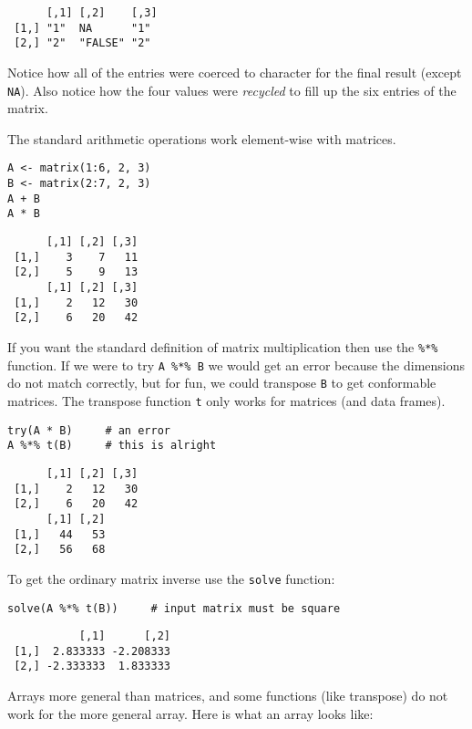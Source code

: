 \documentclass[captions=tableheading]{scrbook}
\begin{document}
\begin{verbatim}
      [,1] [,2]    [,3]
 [1,] "1"  NA      "1" 
 [2,] "2"  "FALSE" "2"
\end{verbatim}

Notice how all of the entries were coerced to character for the final result (except \texttt{NA}). Also notice how the four values were \emph{recycled} to fill up the six entries of the matrix.

The standard arithmetic operations work element-wise with matrices.


\begin{verbatim}
A <- matrix(1:6, 2, 3)
B <- matrix(2:7, 2, 3)
A + B
A * B
\end{verbatim}

\begin{verbatim}
      [,1] [,2] [,3]
 [1,]    3    7   11
 [2,]    5    9   13
      [,1] [,2] [,3]
 [1,]    2   12   30
 [2,]    6   20   42
\end{verbatim}

If you want the standard definition of matrix multiplication then use the \texttt{\%*\%} function. If we were to try \texttt{A \%*\% B} we would get an error because the dimensions do not match correctly, but for fun, we could transpose \texttt{B} to get conformable matrices. The transpose function \texttt{t} only works for matrices (and data frames).


\begin{verbatim}
try(A * B)     # an error
A %*% t(B)     # this is alright
\end{verbatim}

\begin{verbatim}
      [,1] [,2] [,3]
 [1,]    2   12   30
 [2,]    6   20   42
      [,1] [,2]
 [1,]   44   53
 [2,]   56   68
\end{verbatim}

To get the ordinary matrix inverse use the \texttt{solve} function: 


\begin{verbatim}
solve(A %*% t(B))     # input matrix must be square
\end{verbatim}

\begin{verbatim}
           [,1]      [,2]
 [1,]  2.833333 -2.208333
 [2,] -2.333333  1.833333
\end{verbatim}

Arrays more general than matrices, and some functions (like transpose) do not work for the more general array. Here is what an array looks like: 
\end{document}
